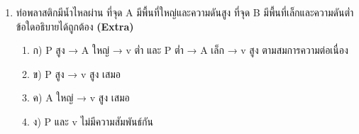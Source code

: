 \documentclass[12pt]{article}
\begin{document}
\begin{enumerate}[label=\arabic*.]
\begin{enumerate}[label=)]
\item ค) เท่าเดิม
\item ง) ขึ้นกับปริมาตรน้ำแข็ง
\end{enumerate}
\item ท่อพลาสติกมีน้ำไหลผ่าน ที่จุด A มีพื้นที่ใหญ่และความดันสูง ที่จุด B มีพื้นที่เล็กและความดันต่ำ ข้อใดอธิบายได้ถูกต้อง \hfill \textbf{\small (Extra)}
\begin{enumerate}[label=)]
\item ก) P สูง → A ใหญ่ → v ต่ำ และ P ต่ำ → A เล็ก → v สูง ตามสมการความต่อเนื่อง
\item ข) P สูง → v สูง เสมอ
\item ค) A ใหญ่ → v สูง เสมอ
\item ง) P และ v ไม่มีความสัมพันธ์กัน
\end{enumerate}
\end{enumerate}
\end{document}
